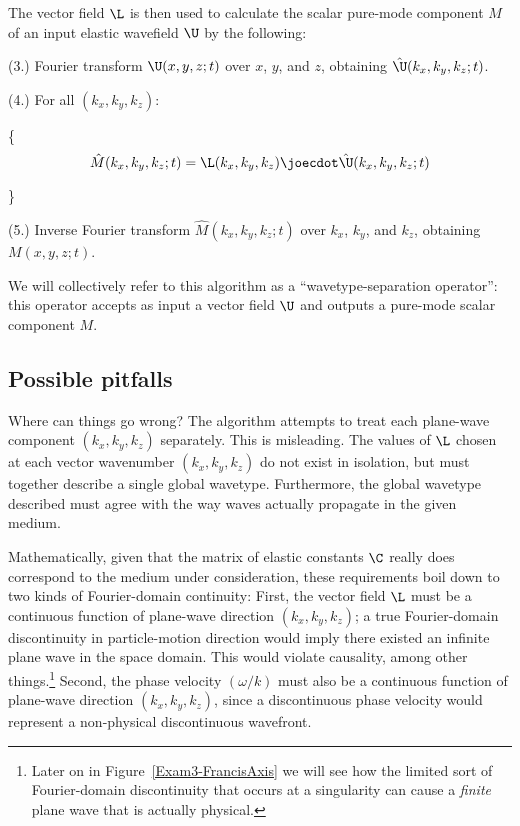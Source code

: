 The vector field $\L$ is then used to calculate the scalar pure-mode
component $M$ of an input elastic wavefield $\U$ by the following:
\begin{list}{}{}
\item[(3.)] Fourier transform $\U(x,y,z;t)$ over $x$, $y$, and $z$,
obtaining $\hat \U(k_x,k_y,k_z;t)$.
\item[(4.)] For all $(k_x,k_y,k_z)$:
\item[] \{
$$ \hat M(k_x,k_y,k_z;t) = \L(k_x,k_y,k_z) \joecdot \hat \U(k_x,k_y,k_z;t) $$
\item[] \}
\item[(5.)] Inverse Fourier transform $\hat M(k_x,k_y,k_z;t)$
over $k_x$, $k_y$, and $k_z$, obtaining $M(x,y,z;t)$.
\end{list}

We will collectively refer to this algorithm
as a ``wavetype-separation operator'':
this operator accepts as input
a vector field $\U$ and outputs a pure-mode scalar component $M$.

\subsection{Possible pitfalls}
Where can things go wrong?
The algorithm attempts to treat each plane-wave component
$(k_x, k_y, k_z)$ separately.
This is misleading.
The values of $\L$ chosen at each vector wavenumber $(k_x,k_y,k_z)$
do not exist in isolation, but must 
together describe a single global wavetype.
Furthermore,
the global wavetype described must agree with the way waves
actually propagate in the given medium.

Mathematically, given that the matrix of elastic constants
$\C$ really does correspond to the medium under consideration,
these requirements boil down to two kinds of Fourier-domain continuity:
First, the vector field $\L$
must be a continuous function of
plane-wave direction $(k_x,k_y,k_z)$; a true Fourier-domain discontinuity
in particle-motion direction would imply there existed an
infinite plane wave in the space domain.
This would violate causality, among other things.\footnote{
Later on in Figure~\protect\ref{Exam3-FrancisAxis} we will see how
the limited sort of Fourier-domain discontinuity that occurs at a singularity
can cause a {\em finite\/} plane wave that is actually physical.
}
Second,
the phase velocity $(\omega / k )$ must also be a
continuous function of plane-wave direction $(k_x,k_y,k_z)$,
since a discontinuous phase velocity would represent
a non-physical discontinuous wavefront.

